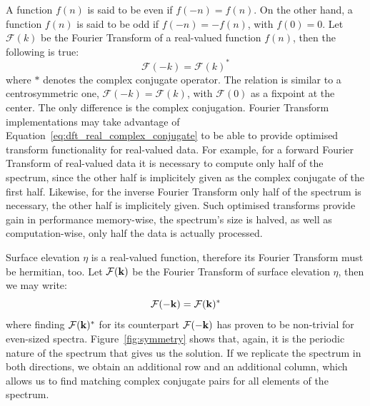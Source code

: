 A function $f(n)$ is said to be even if
$f(-n) = f(n)$. On the other hand, a function $f(n)$ is said to be odd if $f(-n) = -f(n)$,
with $f(0) = 0$. Let $\mathcal{F}(k)$ be the Fourier Transform of a real-valued function $f(n)$, then
the following is true:
\begin{equation}
\label{eq:dft_real_complex_conjugate}
 \mathcal{F}(-k) = \mathcal{F}(k)^*
\end{equation}
where $*$ denotes the complex conjugate operator. The relation is similar to a centrosymmetric one,
$\mathcal{F}(-k) = \mathcal{F}(k)$, with $\mathcal{F}(0)$ as a fixpoint at the center. The only
difference is the complex conjugation. Fourier Transform implementations \citep{misc:fftw,FFTW05}
may take advantage of
Equation~\ref{eq:dft_real_complex_conjugate} to be able to provide optimised transform functionality 
for real-valued data. For example, for a forward Fourier Transform of real-valued data it is
necessary to compute only half of the spectrum, since the other half is implicitely given as the
complex conjugate of the first half. Likewise, for the inverse Fourier Transform only half of the
spectrum is necessary, the other half is implicitely given. Such optimised transforms provide
gain in performance memory-wise, the spectrum's size is halved, as well as computation-wise, only
half the data is actually processed.

Surface elevation $\eta$ is a real-valued function, therefore its Fourier Transform must be hermitian,
too. Let $\mathcal{F}(\mathbf{k})$ be the Fourier Transform of surface elevation $\eta$, then
we may write:
\begin{equation}
\label{eq:h0_k_complex_conjugate}
 \mathcal{F}(-\mathbf{k}) = \mathcal{F}(\mathbf{k})^*
\end{equation}
where finding $\mathcal{F}(\mathbf{k})^*$ for its counterpart $\mathcal{F}(-\mathbf{k})$
has proven to be non-trivial for even-sized spectra.
Figure~\ref{fig:symmetry} shows that, again, it is the periodic nature of the spectrum that gives us the solution.
If we replicate the spectrum in both directions, we obtain an additional row and an additional column, which
allows us to find matching complex conjugate pairs for all elements of the spectrum.

